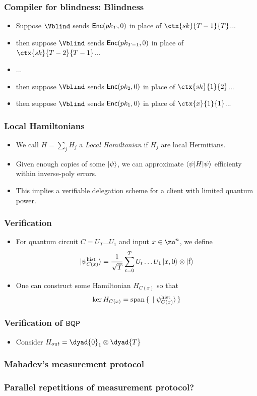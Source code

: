 \documentclass{beamer}
\begin{document}
\begin{frame}
	\frametitle{Compiler for blindness: Blindness}
	\begin{itemize}[<+->]
		\item Suppose $\Vblind$ sends $\mathsf{Enc}(pk_T, 0)$ in place of $\ctx{sk}{T-1}{T}$...
		\item then suppose $\Vblind$ sends $\mathsf{Enc}(pk_{T-1}, 0)$ in place of $\ctx{sk}{T-2}{T-1}$...
		\item ...
		\item then suppose $\Vblind$ sends $\mathsf{Enc}(pk_2, 0)$ in place of $\ctx{sk}{1}{2}$...
		\item then suppose $\Vblind$ sends $\mathsf{Enc}(pk_1, 0)$ in place of $\ctx{x}{1}{1}$...
	\end{itemize}
\end{frame}

\begin{frame}
	\frametitle{Local Hamiltonians}
	\begin{itemize}[<+->]
		\item We call $H=\sum_j H_j$ a \emph{Local Hamiltonian} if $H_j$ are local Hermitians.
		\item Given enough copies of some $\ket\psi$, we can approximate $\braket{\psi|H|\psi}$ efficienty within inverse-poly errors.
		\item This implies a verifiable delegation scheme for a client with limited quantum power.
	\end{itemize}
\end{frame}

\begin{frame}
	\frametitle{Verification}
	\begin{itemize}[<+->]
		\item For quantum circuit $C=U_T\ldots U_1$ and input $x\in\zo^n$, we define $$\ket{\psi_{C(x)}^{\mathrm{hist}}}=\frac{1}{\sqrt{T}}\sum_{t=0}^TU_t\ldots U_1\ket{x,0}\otimes\ket{\hat{t}}$$
		\item One can construct some Hamiltonian $H_{C(x)}$ so that $$\ker H_{C(x)}=\operatorname{span}\set{\ket{\psi_{C(x)}^{\mathrm{hist}}}}$$
	\end{itemize}
\end{frame}

\begin{frame}
	\frametitle{Verification of $\operatorname{\mathsf{BQP}}$}
	\begin{itemize}[<+->]
		\item Consider $H_{out}=\dyad{0}_1\otimes\dyad{T}$
	\end{itemize}

\end{frame}

\begin{frame}
	\frametitle{Mahadev's measurement protocol}

\end{frame}

\begin{frame}
	\frametitle{Parallel repetitions of measurement protocol?}

\end{frame}
\end{document}

